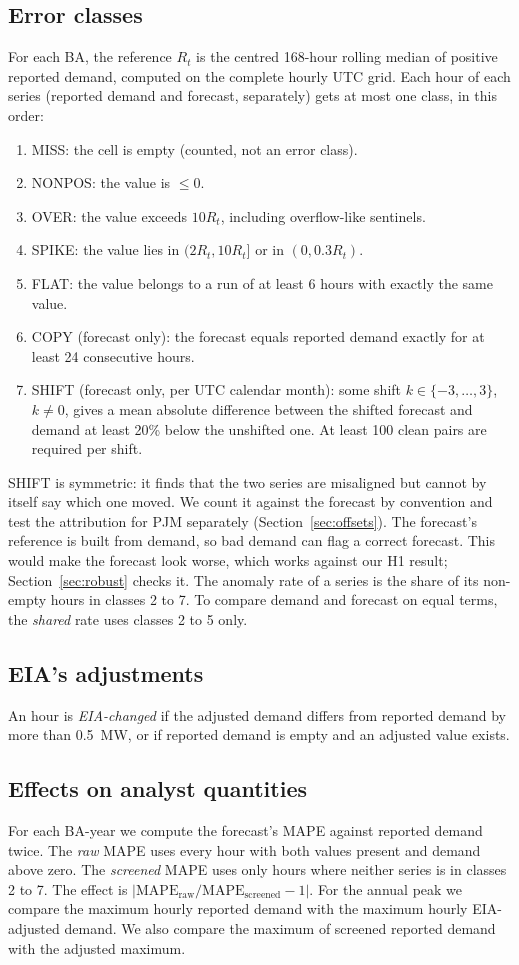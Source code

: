 \documentclass[conference,a4paper]{IEEEtran}
\begin{document}
\subsection{Error classes}
For each BA, the reference $R_t$ is the centred 168-hour rolling median of positive reported demand, computed on the complete hourly UTC grid. Each hour of each series (reported demand and forecast, separately) gets at most one class, in this order:
\begin{enumerate}
\item MISS: the cell is empty (counted, not an error class).
\item NONPOS: the value is $\le 0$.
\item OVER: the value exceeds $10R_t$, including overflow-like sentinels.
\item SPIKE: the value lies in $(2R_t, 10R_t]$ or in $(0, 0.3R_t)$.
\item FLAT: the value belongs to a run of at least 6 hours with exactly the same value.
\item COPY (forecast only): the forecast equals reported demand exactly for at least 24 consecutive hours.
\item SHIFT (forecast only, per UTC calendar month): some shift $k\in\{-3,\dots,3\}$, $k\ne 0$, gives a mean absolute difference between the shifted forecast and demand at least 20\% below the unshifted one. At least 100 clean pairs are required per shift.
\end{enumerate}
SHIFT is symmetric: it finds that the two series are misaligned but cannot by itself say which one moved. We count it against the forecast by convention and test the attribution for PJM separately (Section~\ref{sec:offsets}). The forecast's reference is built from demand, so bad demand can flag a correct forecast. This would make the forecast look worse, which works against our H1 result; Section~\ref{sec:robust} checks it. The anomaly rate of a series is the share of its non-empty hours in classes 2 to 7. To compare demand and forecast on equal terms, the \emph{shared} rate uses classes 2 to 5 only.

\subsection{EIA's adjustments}
An hour is \emph{EIA-changed} if the adjusted demand differs from reported demand by more than 0.5~MW, or if reported demand is empty and an adjusted value exists.

\subsection{Effects on analyst quantities}
For each BA-year we compute the forecast's MAPE against reported demand twice. The \emph{raw} MAPE uses every hour with both values present and demand above zero. The \emph{screened} MAPE uses only hours where neither series is in classes 2 to 7. The effect is $|\mathrm{MAPE}_{\mathrm{raw}}/\mathrm{MAPE}_{\mathrm{screened}}-1|$. For the annual peak we compare the maximum hourly reported demand with the maximum hourly EIA-adjusted demand. We also compare the maximum of screened reported demand with the adjusted maximum.
\end{document}
